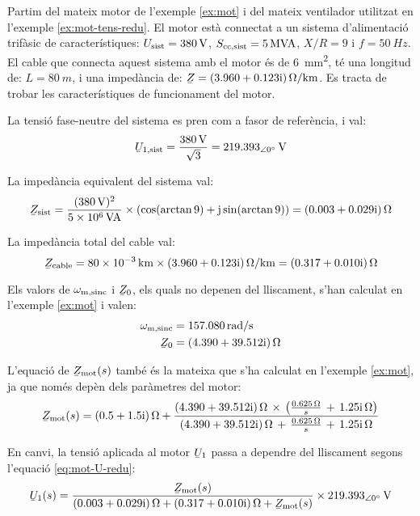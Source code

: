 \begin{exemple}
	Partim del mateix motor de l'exemple \vref{ex:mot} i del mateix ventilador utilitzat en l'exemple \vref{ex:mot-tens-redu}. El motor està connectat a un sistema d'alimentació trifàsic de característiques: $U_\mathrm{sist}=\qty{380}{V}$, $S_\mathrm{cc,sist}=\qty{5}{MVA}$, $X/R=9$ i $f=\qty{50}{Hz}$. El cable que connecta aquest sistema amb el motor és de \qty{6}{mm^2}, té una longitud de:  $L=\qty{80}{m}$, i una impedància de: $\cmplx{Z} = \complexqty{3,960+j0,123}{\ohm/km}$. Es tracta de trobar les característiques de funcionament del motor.
	
	La tensió fase-neutre del sistema es pren com a fasor de referència, i val:
	\[
		\cmplx{U}\ped{1,sist} = \frac{\qty{380}{V}}{\sqrt{3}} = \qtypd{219,393}{0}{V}
	\]
	
	La impedància equivalent del sistema val:
	\[
		\cmplx{Z}\ped{sist} = \frac{(\qty{380}{V})^2}{\qty{5e6}{VA}} \times (\cos(\arctan 9) + \ju \sin(\arctan 9)) = \complexqty{0,003+j0,029}{\ohm}	
	\]
	
	La impedància total del cable val:
	\[
		\cmplx{Z}\ped{cable} = \qty{80e-3}{km} \times \complexqty{3,960+j0,123}{\ohm/km} = \complexqty{0,317+j0,010}{\ohm}
	\]
	
	Els valors de $\omega_\mathrm{m,sinc}$ i $\cmplx{Z}_0$, els quals no depenen del lliscament, s'han calculat en  l'exemple \ref{ex:mot} i valen:
	\begin{align*}
		\omega\ped{m,sinc} &=  \qty{157,080}{rad/s} \\
		\cmplx{Z}_0 &=  \complexqty{4,390+j39,512}{\ohm} 
	\end{align*}
		
	L'equació de $\cmplx{Z}\ped{mot}(s)$ també és la mateixa que s'ha calculat en l'exemple  \ref{ex:mot}, ja que només depèn dels paràmetres del motor:
	\[
		\cmplx{Z}\ped{mot}(s) = \complexqty{0,5+j1,5}{\ohm} + \frac{\complexqty{4,390+j39,512}{\ohm}\,\times\,
		\left(\tfrac{\qty{0,625}{\ohm}}{s}\, + \, \complexqty{j1,25}{\ohm}\right)}{\complexqty{4,390+j39,512}{\ohm}\,+\,
		\tfrac{\qty{0,625}{\ohm}}{s}\, + \,\complexqty{j1,25}{\ohm}}  
	\] 
	
	En canvi, la tensió aplicada al motor $\cmplx{U}_1$ passa a dependre del lliscament segons l'equació \eqref{eq:mot-U-redu}:
	\[
		\cmplx{U}_1(s) = \frac{\cmplx{Z}\ped{mot}(s)}{\complexqty{0,003+j0,029}{\ohm} + \complexqty{0,317+j0,010}{\ohm}  +  \cmplx{Z}\ped{mot}(s)} \times \qtypd{219,393}{0}{V}
	\]
	

\end{exemple}
